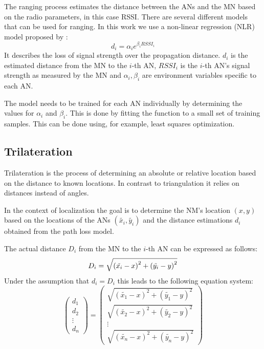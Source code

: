 The ranging process estimates the distance between the ANs and the MN based on the radio parameters, in this case RSSI. There are several different models that can be used for ranging. In this work we use a non-linear regression (NLR) model proposed by \cite{li2015passiveWIFIsource}:
\begin{equation} \label{eqn:non-linear path loss model}
d_{i}=\alpha_{i}e^{\beta_{i}RSSI_{i}}
\end{equation}
It describes the loss of signal strength over the propagation distance. \(d_{i}\) is the estimated distance from the MN to the \(i\)-th AN, \(RSSI_{i}\) is the \(i\)-th AN's signal strength as measured by the MN and \(\alpha_{i}, \beta_{i}\) are environment variables specific to each AN.

The model needs to be trained for each AN individually by determining the values for \(\alpha_{i}\) and \(\beta_{i}\). This is done by fitting the function to a small set of training samples. This can be done using, for example, least squares optimization.

\subsection{Trilateration}

Trilateration is the process of determining an absolute or relative location based on the distance to known locations. In contrast to triangulation it relies on distances instead of angles.

In the context of localization the goal is to determine the NM's location \(\left ( x,y \right )\) based on the locations of the ANs \(\left ( \tilde{x_{i}},\tilde{y_{i}} \right )\) and the distance estimations \(d_{i}\) obtained from the path loss model.

The actual distance \(D_{i}\) from the MN to the \(i\)-th AN can be expressed as follows:
\begin{equation}
D_{i} = \sqrt{\left ( \tilde{x_{i}}-x \right )^{2}+\left ( \tilde{y_{i}}-y \right )^{2}}
\label{eqn: distance MN to AN_{i}}
\end{equation}
Under the assumption that \(d_{i}=D_{i}\) this leads to the following equation system:
\begin{equation}
\begin{pmatrix}
d_{1}\\
d_{2}\\
\vdots\\
d_{n}
\end{pmatrix}
=
\begin{pmatrix}
\sqrt{\left ( \tilde{x_{1}}-x \right )^{2}+\left ( \tilde{y_{1}}-y \right )^{2}}\\
\sqrt{\left ( \tilde{x_{2}}-x \right )^{2}+\left ( \tilde{y_{2}}-y \right )^{2}} \\
\vdots\\
\sqrt{\left ( \tilde{x_{n}}-x \right )^{2}+\left ( \tilde{y_{n}}-y \right )^{2}}
\end{pmatrix}
\label{eqn: trilateration problem as equation system}
\end{equation}

